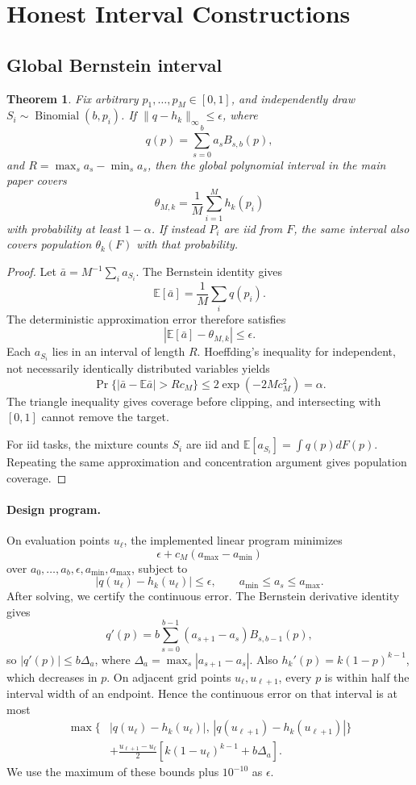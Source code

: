 \documentclass[twoside]{article}
\newtheorem{theorem}{Theorem}
\newcommand{\E}{\mathbb E}
\begin{document}
\section{Honest Interval Constructions}

\subsection{Global Bernstein interval}

\begin{theorem}
Fix arbitrary \(p_1,\ldots,p_M\in[0,1]\), and independently draw
\(S_i\sim\operatorname{Binomial}(b,p_i)\). If
\(\|q-h_k\|_\infty\leq\epsilon\), where
\[
 q(p)=\sum_{s=0}^ba_sB_{s,b}(p),
\]
and \(R=\max_sa_s-\min_sa_s\), then the global polynomial interval in the main
paper covers
\[
 \theta_{M,k}=\frac1M\sum_{i=1}^Mh_k(p_i)
\]
with probability at least \(1-\alpha\). If instead \(P_i\) are iid from \(F\),
the same interval also covers population \(\theta_k(F)\) with that probability.
\end{theorem}

\begin{proof}
Let \(\bar a=M^{-1}\sum_i a_{S_i}\). The Bernstein identity gives
\[
 \E[\bar a]=\frac1M\sum_iq(p_i).
\]
The deterministic approximation error therefore satisfies
\[
 |\E[\bar a]-\theta_{M,k}|\leq\epsilon.
\]
Each \(a_{S_i}\) lies in an interval of length \(R\). Hoeffding's inequality
for independent, not necessarily identically distributed variables yields
\[
 \Pr\{|\bar a-\E\bar a|>Rc_M\}\leq
 2\exp(-2Mc_M^2)=\alpha.
\]
The triangle inequality gives coverage before clipping, and intersecting with
\([0,1]\) cannot remove the target.

For iid tasks, the mixture counts \(S_i\) are iid and
\(\E[a_{S_i}]=\int q(p)dF(p)\). Repeating the same approximation and
concentration argument gives population coverage.
\end{proof}

\paragraph{Design program.}
On evaluation points \(u_\ell\), the implemented linear program minimizes
\[
 \epsilon+c_M(a_{\max}-a_{\min})
\]
over \(a_0,\ldots,a_b,\epsilon,a_{\min},a_{\max}\), subject to
\[
 |q(u_\ell)-h_k(u_\ell)|\leq\epsilon,\qquad
 a_{\min}\leq a_s\leq a_{\max}.
\]
After solving, we certify the continuous error. The Bernstein derivative
identity gives
\[
q'(p)=b\sum_{s=0}^{b-1}(a_{s+1}-a_s)B_{s,b-1}(p),
\]
so \(|q'(p)|\leq b\Delta_a\), where
\(\Delta_a=\max_s|a_{s+1}-a_s|\). Also
\(h_k'(p)=k(1-p)^{k-1}\), which decreases in \(p\). On adjacent grid points
\(u_\ell,u_{\ell+1}\), every \(p\) is within half the interval width of an
endpoint. Hence the continuous error on that interval is at most
\begin{align*}
\max\{&
|q(u_\ell)-h_k(u_\ell)|,\,
|q(u_{\ell+1})-h_k(u_{\ell+1})|\}\\
&+\frac{u_{\ell+1}-u_\ell}{2}
\left[k(1-u_\ell)^{k-1}+b\Delta_a\right].
\end{align*}
We use the maximum of these bounds plus \(10^{-10}\) as \(\epsilon\).
\end{document}
